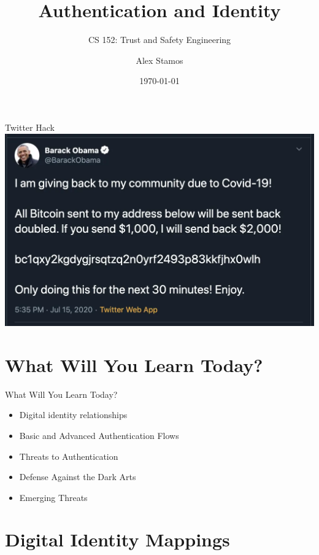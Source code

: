 \documentclass[nobackground,dvipsnames,table]{beamer}
\title{Authentication and Identity}
\subtitle{CS 152: Trust and Safety Engineering}
\author[A. Stamos]{Alex Stamos}
\institute[Stanford University]{Stanford Cyber Policy Center}
\date[2022]{\today}
\begin{document}
\coverpage

\begin{frame}
    \titlepage
\end{frame}


\begin{frame}{Twitter Hack}
    \includegraphics[width=\textwidth]{thanks-obama}
\end{frame}

\section{What Will You Learn Today?}

\begin{frame}{What Will You Learn Today?}%
    \large
    \begin{itemize}
        \item Digital identity relationships
        \item Basic and Advanced Authentication Flows
        \item Threats to Authentication
        \item Defense Against the Dark Arts
        \item Emerging Threats
    \end{itemize}
\end{frame}

\section{Digital Identity Mappings}
\end{document}
